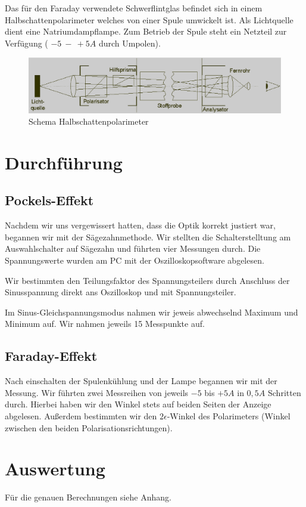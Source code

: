 \documentclass[12pt]{article}
\begin{document}
Das für den Faraday verwendete Schwerflintglas befindet sich in einem Halbschattenpolarimeter welches von einer Spule umwickelt ist. Als Lichtquelle dient eine Natriumdampflampe. Zum Betrieb der Spule steht ein Netzteil zur Verfügung ( $-5~-~+5A$ durch Umpolen).

\begin{figure}[H]
\centering
\includegraphics[width=1\linewidth]{pictures/halbschattenpolarimeter.eps}
\caption{Schema Halbschattenpolarimeter}
\end{figure}


\section{Durchführung}
\subsection{Pockels-Effekt}
Nachdem wir uns vergewissert hatten, dass die Optik korrekt justiert war, begannen wir mit der Sägezahnmethode.
Wir stellten die Schalterstelltung am Auswahlschalter auf Sägezahn und führten vier Messungen durch. Die Spannungswerte wurden am PC mit der Oszilloskopsoftware abgelesen.

Wir bestimmten den Teilungsfaktor des Spannungsteilers durch Anschluss der Sinusspannung direkt ans Oszilloskop und mit Spannungsteiler.

Im Sinus-Gleichspannungsmodus nahmen wir jeweis abwechselnd Maximum und Minimum auf. Wir nahmen jeweils 15 Messpunkte auf.

\subsection{Faraday-Effekt}
Nach einschalten der Spulenkühlung und der Lampe begannen wir mit der Messung.
Wir führten zwei Messreihen von jeweils $-5$ bis $+5A$ in $0,5A$ Schritten durch. Hierbei haben wir den Winkel stets auf beiden Seiten der Anzeige abgelesen. Außerdem bestimmten wir den $2\epsilon$-Winkel des Polarimeters (Winkel zwischen den beiden Polarisationsrichtungen).


\section{Auswertung}
Für die genauen Berechnungen siehe Anhang.
\end{document}
